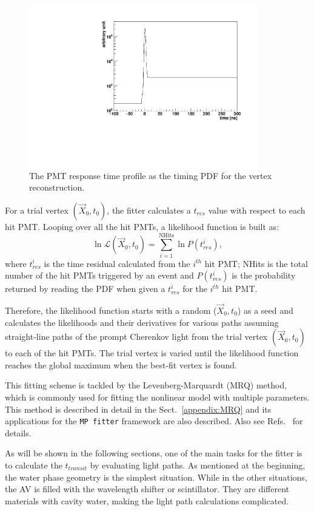 \begin{figure}[!htb]
	\centering
	\includegraphics[width=10cm]{MPW_timingPDF.pdf}
	\caption{The PMT response time profile as the timing PDF for the vertex reconstruction.}
	\label{fig:MPW_timingPDF}
\end{figure}

For a trial vertex $(\vec{X}_0,t_0)$, the fitter calculates a $t_{res}$ value with respect to each hit PMT. Looping over all the hit PMTs, a likelihood function is built as:
\begin{equation}\label{eq:vertexLogL}
\ln\mathcal{L}(\vec{X}_0,t_0)=\sum_{i=1}^{{\mathrm{NHits}}}\ln P(t^i_{res}),
\end{equation}
where $t^i_{res}$ is the time residual calculated from the $i^{th}$ hit PMT; NHits is the total number of the hit PMTs triggered by an event and $P(t^i_{res})$ is the probability returned by reading the PDF when given a $t^i_{res}$ for the $i^{th}$ hit PMT.

Therefore, the likelihood function starts with a random ($\vec{X}_0,t_0$) as a seed and calculates the likelihoods and their derivatives for various paths assuming straight-line paths of the prompt Cherenkov light from the trial vertex $(\vec{X}_0,t_0)$ to each of the hit PMTs. The trial vertex is varied until the likelihood function reaches the global maximum when the best-fit vertex is found.

This fitting scheme is tackled by the Levenberg-Marquardt (MRQ) method, which is commonly used for fitting the nonlinear model with multiple parameters. This method is described in detail in the Sect.~\ref{appendix:MRQ} and its applications for the \texttt{MP fitter} framework are also described. Also see Refs.~\cite{gregory2005bayesian, press2007numerical} for details.

As will be shown in the following sections, one of the main tasks for the fitter is to calculate the $t_{transit}$ by evaluating light paths.  As mentioned at the beginning, the water phase geometry is the simplest situation. While in the other situations, the AV is filled with the wavelength shifter or scintillator. They are different materials with cavity water, making the light path calculations complicated.


